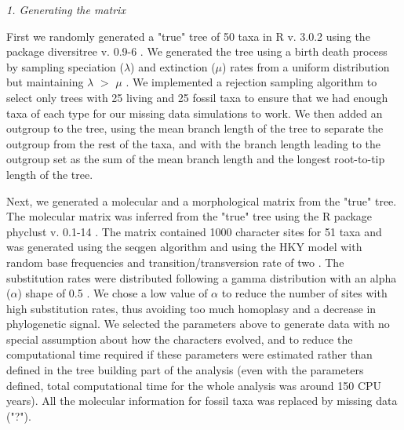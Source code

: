 \documentclass[12pt,letterpaper]{article}
\renewcommand{\subsection}[1]{%
\bigskip
\begin{center}
\begin{large}
\normalfont\itshape #1
\end{large}
\end{center}}
\begin{document}
\subsection{1. Generating the matrix}
\label{Generating_the_matrix}
First we randomly generated a "true" tree of 50 taxa in R v. 3.0.2 \citep{R302} using the package diversitree v. 0.9-6 \citep{fitzjohndiversitree2012}. We generated the tree using a birth death process by sampling speciation ($\lambda$) and extinction ($\mu$) rates from a uniform distribution but maintaining $\lambda$ $>$ $\mu$ \citep{paradistime-dependent2011}. We implemented a rejection sampling algorithm to select only trees with 25 living and 25 fossil taxa to ensure that we had enough taxa of each type for our missing data simulations to work. We then added an outgroup to the tree, using the mean branch length of the tree to separate the outgroup from the rest of the taxa, and with the branch length leading to the outgroup set as the sum of the mean branch length and the longest root-to-tip length of the tree.

Next, we generated a molecular and a morphological matrix from the "true" tree. The molecular matrix was inferred from the "true" tree using the R package phyclust v. 0.1-14 \citep{chen2011}. The matrix contained 1000 character sites for 51 taxa and was generated using the seqgen algorithm \citep{ranbaut1997seqgen} and using the HKY model \citep{HKY85} with random base frequencies and transition/transversion rate of two \citep{douadycomparison2003}. The substitution rates were distributed following a gamma distribution with an alpha ($\alpha$) shape of 0.5 \citep{yangamong-site1996}. We chose a low value of $\alpha$ to reduce the number of sites with high substitution rates, thus avoiding too much homoplasy and a decrease in phylogenetic signal. We selected the parameters above to generate data with no special assumption about how the characters evolved, and to reduce the computational time required if these parameters were estimated rather than defined in the tree building part of the analysis (even with the parameters defined, total computational time for the whole analysis was around 150 CPU years). All the molecular information for fossil taxa was replaced by missing data ("?").
\end{document}
